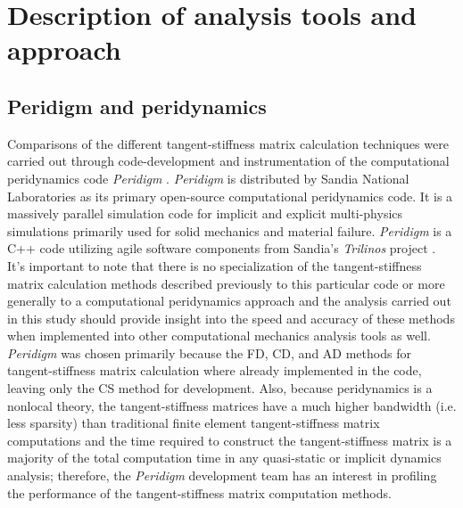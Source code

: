 \documentclass[preprint,12pt]{elsarticle}
\begin{document}
\section{Description of analysis tools and approach} 
%
\subsection{Peridigm and peridynamics}
\label{subsec:PaP}
%
Comparisons of the different tangent-stiffness matrix calculation techniques were carried out through code-development and instrumentation of the computational peridynamics code \emph{Peridigm} \cite{peridigm}.  \emph{Peridigm} is distributed by Sandia National Laboratories as its primary open-source computational peridynamics code. It is a massively parallel simulation code for implicit and explicit multi-physics simulations primarily used for solid mechanics and material failure. \emph{Peridigm} is a C++ code utilizing agile software components from Sandia's \emph{Trilinos} project \cite{trilinos}. It's important to note that there is no specialization of the tangent-stiffness matrix calculation methods described previously to this particular code or more generally to a computational peridynamics approach and the analysis carried out in this study should provide insight into the speed and accuracy of these methods when implemented into other computational mechanics analysis tools as well.  \emph{Peridigm} was chosen primarily because the FD, CD, and AD methods for tangent-stiffness matrix calculation where already implemented in the code, leaving only the CS method for development. Also, because peridynamics is a nonlocal theory, the tangent-stiffness matrices have a much higher bandwidth (i.e. less sparsity) than traditional finite element tangent-stiffness matrix computations and the time required to construct the tangent-stiffness matrix is a majority of the total computation time in any quasi-static or implicit dynamics analysis; therefore, the \emph{Peridigm} development team has an interest in profiling the performance of the tangent-stiffness matrix computation methods.
\end{document}
